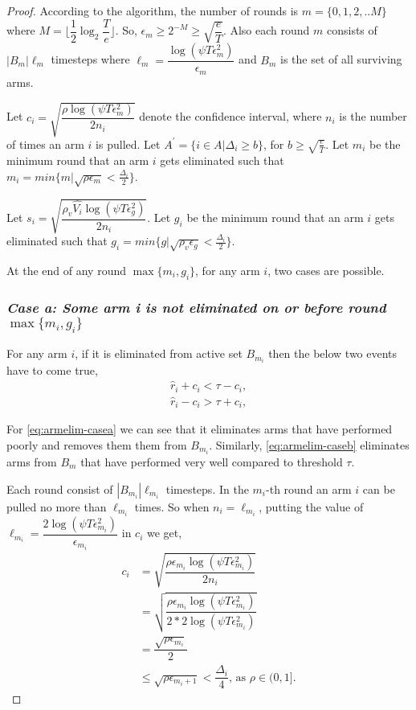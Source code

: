 \begin{proof}

According to the algorithm, the number of rounds is $m=\lbrace 0,1,2,.. M\rbrace $ where $M=\bigg\lfloor \dfrac{1}{2}\log_{2} \dfrac{T}{e}\bigg\rfloor$. So, $\epsilon_{m}\geq 2^{-M}\geq \sqrt{\dfrac{e}{T}}$. Also each round $m$ consists of $|B_{m}|\ell_{m}$ timesteps where $\ell_{m} = \dfrac{\log(\psi T \epsilon_{m}^{2})}{\epsilon_{m}}$ and $B_{m}$ is the set of all surviving arms. 

Let $c_{i} = \sqrt{\dfrac{\rho\log{(\psi T\epsilon_{m}^{2})}}{2 n_{i}}}$ denote the confidence interval, where $n_{i}$ is the number of times an arm $i$ is pulled. Let $A^{'}=\lbrace i\in A|\Delta_{i}\geq b\rbrace$, for $b\geq \sqrt{\frac{e}{T}}$. Let $m_{i}$ be the minimum round that an arm $i$ gets eliminated such that $m_{i}=min\lbrace m| \sqrt{\rho\epsilon_{m}}<\frac{\Delta_{i}}{2}\rbrace$. 


Let $s_{i}=\sqrt{\dfrac{\rho_v \hat{V_{i}} \log{(\psi T\epsilon_{g}^{2})}}{2 n_{i}}}$. Let $g_{i}$ be the minimum round that an arm $i$ gets eliminated such that $g_{i}=min\lbrace g| \sqrt{\rho_{v}\epsilon_{g}}<\frac{\Delta_{i}}{2}\rbrace$. 

At the end of any round $\max\lbrace m_{i},g_{i}\rbrace$, for any arm $i$, two cases are possible.

\subsubsection{\textit{Case a: Some arm i is not eliminated on or before round $\max\lbrace m_{i},g_{i}\rbrace$}}
For any arm $i$, if it is eliminated from active set $B_{m_{i}}$ then the below two events have to come true,
\begin{align}
\hat{r}_{i} + c_{i} < \tau - c_{i}, \label{eq:armelim-casea}\\
\hat{r}_{i} - c_{i} > \tau + c_{i}, \label{eq:armelim-caseb}
\end{align}

For \ref{eq:armelim-casea} we can see that it eliminates arms that have performed poorly and removes them them from $B_{m_{i}}$. Similarly, \ref{eq:armelim-caseb} eliminates arms from $B_{m}$ that have performed very well compared to threshold $\tau$.

Each round consist of $|B_{m_{i}}|\ell_{m_{i}}$ timesteps. In the $m_{i}$-th round an arm $i$ can be pulled no more than $\ell_{m_{i}}$ times. So when $n_{i}=\ell_{m_{i}}$, putting the value of $\ell_{m_{i}}=\dfrac{2\log{(\psi T\epsilon_{m_{i}}^{2})}}{\epsilon_{m_{i}}}$ in $c_{i}$ we get, 
\begin{align*}
c_{i}&=\sqrt{\dfrac{\rho\epsilon_{m_{i}}\log (\psi T\epsilon_{m_{i}}^{2})}{2 n_{i}}}\\
&=\sqrt{\dfrac{\rho\epsilon_{m_{i}}\log (\psi T\epsilon_{m_{i}}^{2})}{2*2 \log(\psi T\epsilon_{m_{i}}^{2})}}\\
& =\dfrac{\sqrt{\rho\epsilon_{m_{i}}}}{2}\\
& \leq \sqrt{\rho\epsilon_{m_{i}+1}} < \dfrac{\Delta_{i}}{4} \text{, as }\rho\in (0,1].
\end{align*}


\end{proof}
